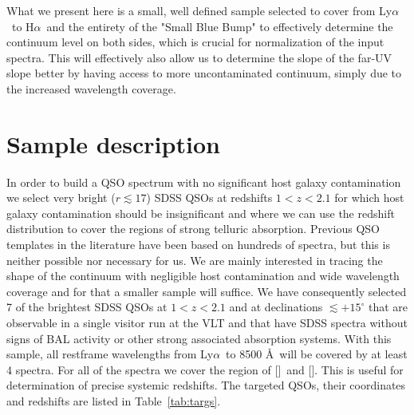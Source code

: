 \documentclass{aa}    %
\newcommand{\Tab}[1]{Table~\ref{tab:#1}}
\newcommand{\tab}[1]{\Tab{#1}}
\newcommand{\sectlabel}[1]{\label{sect:#1}}
\newcommand{\lya}{Ly$\alpha$}
\newcommand{\ha}{H$\alpha$}
\newcommand{\oii}{[\ion{O}{ii}]}
\newcommand{\oiii}{[\ion{O}{iii}]}
\begin{document}
 What we present here is a small, well defined sample selected to cover from \lya~to \ha~and the entirety of the "Small Blue Bump" to effectively determine the continuum level on both sides, which is crucial for normalization of the input spectra. This will effectively also allow us to determine the slope of the far-UV slope better by having access to more uncontaminated continuum, simply due to the increased wavelength coverage. 


\section{Sample description}   \sectlabel{sample}


In order to build a QSO spectrum with no significant host galaxy contamination we select very bright ($r \lesssim 17$) SDSS QSOs at redshifts $1 < z < 2.1$ for which host galaxy contamination should be insignificant and where we can use the redshift distribution to cover the regions of strong telluric absorption. Previous QSO templates in the literature have been based on hundreds of spectra, but this is neither possible nor necessary for us. We are mainly interested in tracing the shape of the continuum with negligible host contamination and wide wavelength coverage and for that a smaller sample will suffice. We have consequently selected 7 of the brightest SDSS QSOs at $1 < z < 2.1$ and at declinations $\lesssim +15^\circ$ that are observable in a single visitor run at the VLT and that have SDSS spectra without signs of BAL activity or other strong associated absorption systems. With this sample, all restframe wavelengths from \lya~to 8500 \AA~will be covered by at least 4 spectra. For all of the spectra we cover the region of \oii~and \oiii. This is useful for determination of precise systemic redshifts. The targeted QSOs, their coordinates and redshifts are listed in \tab{targs}.
\end{document}
